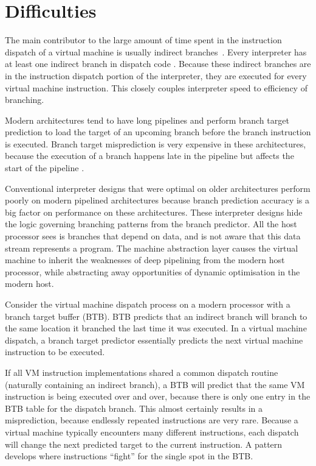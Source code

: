 	\section{Difficulties}
		The main contributor to the large amount of time spent in the instruction dispatch of a virtual machine is usually  indirect branches~\citep{optimizingindirectbranch}. Every interpreter has at least one indirect branch in dispatch code \citep{modernarchvm}. Because these indirect branches are in the instruction dispatch portion of the interpreter, they are executed for every virtual machine instruction. This closely couples interpreter speed to efficiency of branching.
		
		Modern architectures tend to have long pipelines and perform branch target prediction to load the target of an upcoming branch before the branch instruction is executed. Branch target misprediction is very expensive in these architectures, because the execution of a branch happens late in the pipeline but affects the start of the pipeline \citep{optimizingindirectbranch}.
				
		Conventional interpreter designs that were optimal on older architectures perform poorly on modern pipelined architectures because branch prediction accuracy is a big factor on performance on these architectures. These interpreter designs hide the logic governing branching patterns from the branch predictor. All the host processor sees is branches that depend on data, and is not aware that this data stream represents a program. The machine abstraction layer causes the virtual machine to inherit the weaknesses of deep pipelining from the modern host processor, while abstracting away opportunities of dynamic optimisation in the modern host.
		
		Consider the virtual machine dispatch process on a modern processor with a branch target buffer (BTB). BTB predicts that an indirect branch will branch to the same location it branched the last time it was executed. In a virtual machine dispatch, a branch target predictor essentially predicts the next virtual machine instruction to be executed.
		
		If all VM instruction implementations shared a common dispatch routine (naturally containing an indirect branch), a BTB will predict that the same VM instruction is being executed over and over, because there is only one entry in the BTB table for the dispatch branch. This almost certainly results in a misprediction, because endlessly repeated instructions are very rare. Because a virtual machine typically encounters many different instructions, each dispatch will change the next predicted target to the current instruction. A pattern develops where instructions ``fight'' for the single spot in the BTB.
		

